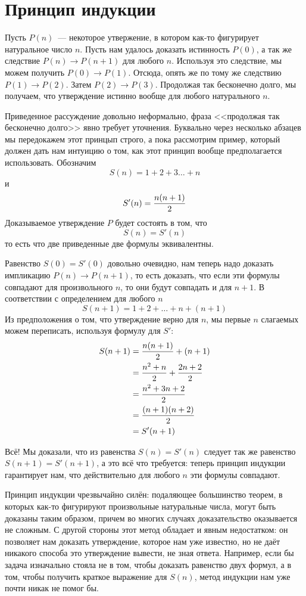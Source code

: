 \section{Принцип индукции}

Пусть $P(n)$~--- некоторое утвержение, в котором как-то фигурирует натуральное число $n$. Пусть нам удалось доказать истинность $P(0)$, а так же следствие $P(n)\to P(n+1)$ для любого $n$. Используя это следствие, мы можем получить $P(0)\to P(1)$. Отсюда, опять же по тому же следствию $P(1)\to P(2)$. Затем $P(2)\to P(3)$. Продолжая так бесконечно долго, мы получаем, что утверждение истинно вообще для любого натурального $n$.

Приведенное рассуждение довольно неформально, фраза <<продолжая так бесконечно долго>> явно требует уточнения. Буквально через несколько абзацев мы передокажем этот принцып строго, а пока рассмотрим пример, который должен дать нам интуицию о том, как этот принцип вообще предполагается использовать. Обозначим
$$S(n) = 1 + 2 +3 \ldots + n$$
и
$$S'(n) = {n(n+1)\over 2}$$
Доказываемое утверждение $P$ будет состоять в том, что
$$S(n) = S'(n)$$
то есть что две приведенные две формулы эквивалентны.

Равенство $S(0) = S'(0)$ довольно очевидно, нам теперь надо доказать импликацию $P(n)\to P(n + 1)$, то есть доказать, что если эти формулы совпадают для произвольного $n$, то они будут совпадать и для $n + 1$. В соответствии с определением для любого $n$
$$S(n + 1) = 1 + 2 + \ldots + n + (n + 1)$$
Из предположения о том, что утверждение верно для $n$, мы первые $n$ слагаемых можем переписать, используя формулу для $S'$:
\begin{align*}
S(n + 1) &= {n(n + 1)\over 2} + (n + 1)\\
	&= {n^2 + n\over 2} + {2n + 2\over 2} \\
	&= {n^ 2 + 3n + 2 \over 2} \\
	&= {(n + 1)(n + 2)\over 2} \\
	&= {S'(n + 1)}
\end{align*}

Всё! Мы доказали, что из равенства $S(n)=S'(n)$ следует так же равенство $S(n+1)=S'(n+1)$, а это всё что требуется: теперь принцип индукции гарантирует нам, что действительно для любого $n$ эти формулы совпадают.

Принцип индукции чрезвычайно силён: подаляющее большинство теорем, в которых как-то фигурируют произвольные натуральные числа, могут быть доказаны таким образом, причем во многих случаях доказательство оказывается не сложным. С другой стороны этот метод обладает и явным недостатком: он позволяет нам доказать утверждение, которое нам уже известно, но не даёт никакого способа это утверждение вывести, не зная ответа. Например, если бы задача изначально стояла не в том, чтобы доказать равенство двух формул, а в том, чтобы получить краткое выражение для $S(n)$, метод индукции нам уже почти никак не помог бы.

